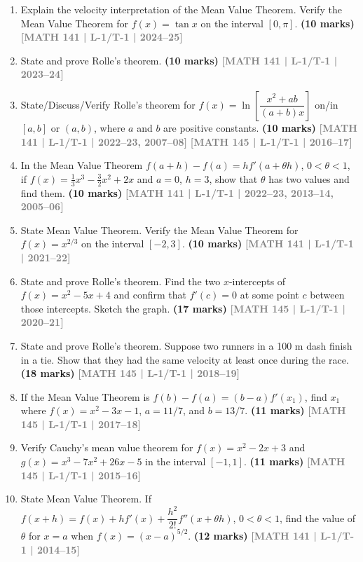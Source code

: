\documentclass[12pt,a3paper]{article}
\newcommand{\yr}[1]{\hfill\textcolor{gray}{\small\textbf{[#1]}}}
\newcommand{\mk}[1]{\textcolor{orange!70!black}{\small\textbf{(#1 marks)}}}
\begin{document}
\begin{enumerate}

\item Explain the velocity interpretation of the Mean Value Theorem. Verify the Mean Value Theorem for $f(x)=\tan x$ on the interval $[0,\pi]$.
\mk{10} \yr{MATH 141 | L-1/T-1 | 2024--25}

\item State and prove Rolle's theorem.
\mk{10} \yr{MATH 141 | L-1/T-1 | 2023--24}

\item State/Discuss/Verify Rolle's theorem for $f(x)=\ln\!\left[\dfrac{x^{2}+ab}{(a+b)x}\right]$ on/in $[a,b]$ or $(a,b)$, where $a$ and $b$ are positive constants.
\mk{10} \yr{MATH 141 | L-1/T-1 | 2022--23, 2007--08} \yr{MATH 145 | L-1/T-1 | 2016--17}

\item In the Mean Value Theorem $f(a+h)-f(a)=hf'(a+\theta h)$, $0<\theta<1$, if $f(x)=\tfrac{1}{3}x^{3}-\tfrac{3}{2}x^{2}+2x$ and $a=0$, $h=3$, show that $\theta$ has two values and find them.
\mk{10} \yr{MATH 141 | L-1/T-1 | 2022--23, 2013--14, 2005--06}

\item State Mean Value Theorem. Verify the Mean Value Theorem for $f(x)=x^{2/3}$ on the interval $[-2,3]$.
\mk{10} \yr{MATH 141 | L-1/T-1 | 2021--22}

\item State and prove Rolle's theorem. Find the two $x$-intercepts of $f(x)=x^{2}-5x+4$ and confirm that $f'(c)=0$ at some point $c$ between those intercepts. Sketch the graph.
\mk{17} \yr{MATH 145 | L-1/T-1 | 2020--21}

\item State and prove Rolle's theorem. Suppose two runners in a 100 m dash finish in a tie. Show that they had the same velocity at least once during the race.
\mk{18} \yr{MATH 145 | L-1/T-1 | 2018--19}

\item If the Mean Value Theorem is $f(b)-f(a)=(b-a)f'(x_{1})$, find $x_{1}$ where $f(x)=x^{2}-3x-1$, $a=11/7$, and $b=13/7$.
\mk{11} \yr{MATH 145 | L-1/T-1 | 2017--18}

\item Verify Cauchy's mean value theorem for $f(x)=x^{2}-2x+3$ and $g(x)=x^{3}-7x^{2}+26x-5$ in the interval $[-1,1]$.
\mk{11} \yr{MATH 145 | L-1/T-1 | 2015--16}

\item State Mean Value Theorem. If $f(x+h)=f(x)+hf'(x)+\dfrac{h^{2}}{2!}f''(x+\theta h)$, $0<\theta<1$, find the value of $\theta$ for $x=a$ when $f(x)=(x-a)^{5/2}$.
\mk{12} \yr{MATH 141 | L-1/T-1 | 2014--15}


\end{enumerate}
\end{document}
